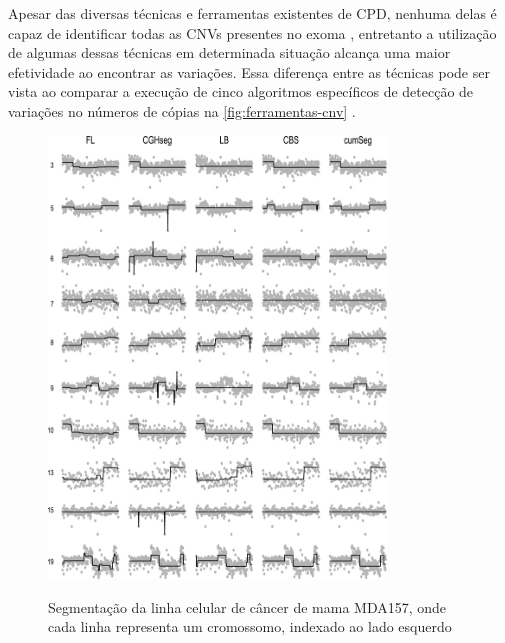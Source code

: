 Apesar das diversas técnicas e ferramentas existentes de CPD, nenhuma delas é capaz de identificar todas as CNVs presentes no exoma \cite{Zhao2013}, entretanto a utilização de algumas dessas técnicas em determinada situação alcança uma maior efetividade ao encontrar as variações. Essa diferença entre as técnicas pode ser vista ao comparar a execução de cinco algoritmos específicos de detecção de variações no números de cópias na \autoref{fig:ferramentas-cnv} \cite{Muggeo2010}.

\begin{figure}[!htb]
    \centering
    \caption{Segmentação da linha celular de câncer de mama MDA157, onde cada linha representa um cromossomo, indexado ao lado esquerdo}
    \includegraphics[width=0.8\textwidth]{./dados/figuras/ferramentas-cnv}
    \label{fig:ferramentas-cnv}
\end{figure}




